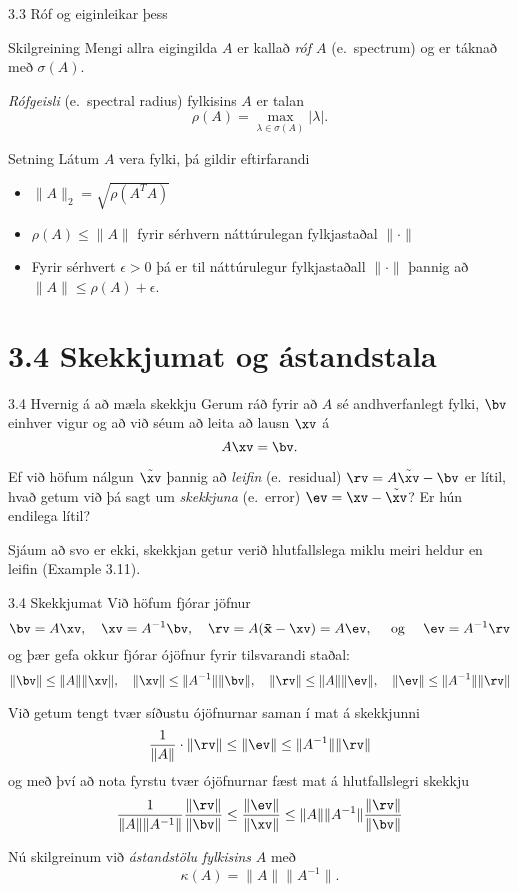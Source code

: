 \begin{frame}{3.3 Róf og eiginleikar þess}
\begin{block}{Skilgreining}
Mengi allra eigingilda $A$ er kallað \emph{róf $A$} (e.~spectrum) og er táknað með $\sigma(A)$.
\pause

\emph{Rófgeisli} (e.~spectral radius) fylkisins $A$ er talan
$$
\rho(A) = \max_{\lambda \in \sigma(A)} |\lambda|.
$$
\end{block}


\begin{block}{Setning}
Látum $A$ vera fylki, þá gildir eftirfarandi \pause
 \begin{itemize}
  \item $\|A\|_2 = \sqrt{\rho(A^T A)}$\pause
  \item $\rho(A) \leq \|A\|$ fyrir sérhvern náttúrulegan fylkjastaðal $\|\cdot\|$\pause
  \item Fyrir sérhvert $\epsilon >0$ þá er til náttúrulegur fylkjastaðall $\|\cdot\|$ þannig
að $\|A\| \leq \rho(A) + \epsilon$.
 \end{itemize}

\end{block} 
\end{frame}

\section*{3.4 Skekkjumat og ástandstala}
\begin{frame}{3.4 Hvernig á að mæla skekkju}
 Gerum ráð fyrir að $A$ sé andhverfanlegt fylki, $\bv$ einhver vigur og að við séum að
leita að lausn $\xv$ á 
$$
A\xv = \bv.
$$
\pause
\medskip

Ef við höfum nálgun $\tilde \xv$ þannig að \emph{leifin} (e.~residual) $\rv = A\tilde \xv - \bv$ er lítil, hvað 
getum við þá sagt um \emph{skekkjuna} (e.~error) $\ev = \xv -\tilde \xv$? Er hún endilega lítil?

\pause
\medskip

Sjáum að svo er ekki, skekkjan getur verið hlutfallslega miklu meiri heldur en leifin
(Example 3.11).


\end{frame}

\begin{frame}{3.4 Skekkjumat}
Við höfum fjórar jöfnur
$$
\bv=A\xv, \quad \xv=A^{-1}\bv, \quad 
\rv=A(\mathbf{\tilde x}-\xv)=A\ev, \quad \text{ og } \quad
\ev=A^{-1}\rv
$$\pause
og þær gefa okkur fjórar ójöfnur fyrir tilsvarandi staðal:
$$
\|\bv\|\leq \|A\|\|\xv\|, \quad  \|\xv\|\leq \|A^{-1}\|\|\bv\|, 
\quad  
\|\rv\|\leq \|A\|\|\ev\|, \quad  \|\ev\|\leq \|A^{-1}\|\|\rv\|
$$

\pause
\smallskip
Við getum tengt tvær síðustu ójöfnurnar saman í mat á skekkjunni
$$
\dfrac 1{\|A\|}\cdot  \|\rv\|
\leq  \|\ev\| \leq 
\|A^{-1}\| \|\rv\|
$$\pause
og með því að nota fyrstu tvær ójöfnurnar fæst mat á hlutfallslegri skekkju
$$
\dfrac 1{\|A\|\|A^{-1}\|}\dfrac{ \|\rv\|}{\|\bv\|} 
\leq \dfrac{\|\ev\|}{\|\xv\|} \leq 
\|A\|\|A^{-1}\|\dfrac{\|\rv\|}{\|\bv\|}
$$

\pause
\smallskip
Nú skilgreinum við {\it ástandstölu fylkisins} $A$ með
$$
\kappa(A)=\|A\|\|A^{-1}\|.
$$
\end{frame}


